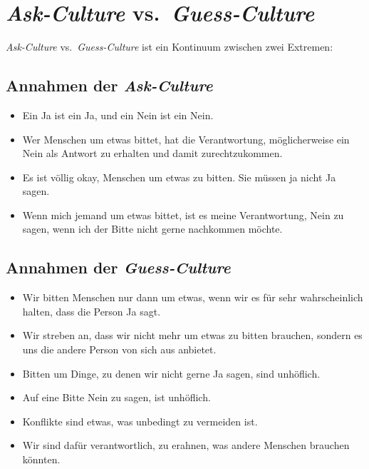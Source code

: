 \section{\emph{Ask-Culture} vs.~\emph{Guess-Culture}}
\label{ask-guess-culture}

\emph{Ask-Culture} vs.~\emph{Guess-Culture}\cite{ask-guess-culture} ist ein Kontinuum zwischen zwei Extremen:


\subsection{Annahmen der \emph{Ask-Culture}}

\begin{itemize}
  \item Ein Ja ist ein Ja, und ein Nein ist ein Nein.
  \item Wer Menschen um etwas bittet, hat die Verantwortung, möglicherweise ein Nein als Antwort zu erhalten und damit zurechtzukommen.
  \item Es ist völlig okay, Menschen um etwas zu bitten. Sie müssen ja nicht Ja sagen.
  \item Wenn mich jemand um etwas bittet, ist es meine Verantwortung, Nein zu sagen, wenn ich der Bitte nicht gerne nachkommen möchte.
\end{itemize}


\subsection{Annahmen der \emph{Guess-Culture}}

\begin{itemize}
  \item Wir bitten Menschen nur dann um etwas, wenn wir es für sehr wahrscheinlich halten, dass die Person Ja sagt.
  \item Wir streben an, dass wir nicht mehr um etwas zu bitten brauchen, sondern es uns die andere Person von sich aus anbietet.
  \item Bitten um Dinge, zu denen wir nicht gerne Ja sagen, sind unhöflich.
  \item Auf eine Bitte Nein zu sagen, ist unhöflich.
  \item Konflikte sind etwas, was unbedingt zu vermeiden ist.
  \item Wir sind dafür verantwortlich, zu erahnen, was andere Menschen brauchen könnten.
\end{itemize}


